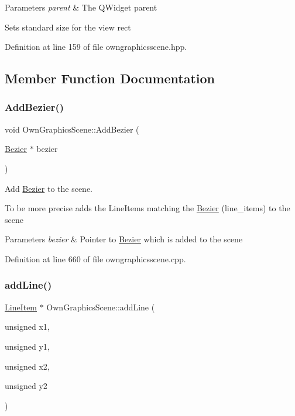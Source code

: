 \begin{DoxyParams}{Parameters}
{\em parent} & The Q\+Widget parent\\
\hline
\end{DoxyParams}
Sets standard size for the view rect 

Definition at line 159 of file owngraphicsscene.\+hpp.



\subsection{Member Function Documentation}
\mbox{\label{classOwnGraphicsScene_ac0c5440d16675d6bf8c27767d2721622}} 
\subsubsection{\texorpdfstring{Add\+Bezier()}{AddBezier()}}
{\footnotesize\ttfamily void Own\+Graphics\+Scene\+::\+Add\+Bezier (\begin{DoxyParamCaption}\item[{\mbox{\hyperlink{classBezier}{Bezier}} $\ast$}]{bezier }\end{DoxyParamCaption})}



Add \mbox{\hyperlink{classBezier}{Bezier}} to the scene. 

To be more precise adds the Line\+Items matching the \mbox{\hyperlink{classBezier}{Bezier}} (line\+\_\+items) to the scene 
\begin{DoxyParams}{Parameters}
{\em bezier} & Pointer to \mbox{\hyperlink{classBezier}{Bezier}} which is added to the scene \\
\hline
\end{DoxyParams}


Definition at line 660 of file owngraphicsscene.\+cpp.

\mbox{\label{classOwnGraphicsScene_a4251b836ee575083f4eeaa73254723f4}} 
\subsubsection{\texorpdfstring{add\+Line()}{addLine()}}
{\footnotesize\ttfamily \mbox{\hyperlink{classLineItem}{Line\+Item}} $\ast$ Own\+Graphics\+Scene\+::add\+Line (\begin{DoxyParamCaption}\item[{unsigned}]{x1,  }\item[{unsigned}]{y1,  }\item[{unsigned}]{x2,  }\item[{unsigned}]{y2 }\end{DoxyParamCaption})}



